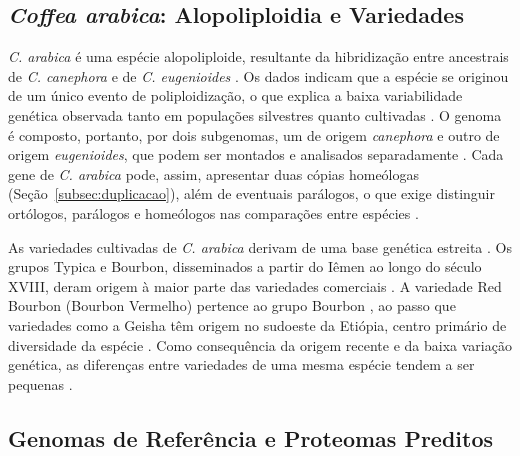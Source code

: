 \subsection{\textit{Coffea arabica}: Alopoliploidia e Variedades}

\textit{C. arabica} é uma espécie alopoliploide, resultante da hibridização entre ancestrais de \textit{C. canephora} e de \textit{C. eugenioides} \cite{Lashermes1999, Scalabrin2020}. Os dados indicam que a espécie se originou de um único evento de poliploidização, o que explica a baixa variabilidade genética observada tanto em populações silvestres quanto cultivadas \cite{Scalabrin2020}. O genoma é composto, portanto, por dois subgenomas, um de origem \textit{canephora} e outro de origem \textit{eugenioides}, que podem ser montados e analisados separadamente \cite{Scalabrin2020}. Cada gene de \textit{C. arabica} pode, assim, apresentar duas cópias homeólogas (Seção~\ref{subsec:duplicacao}), além de eventuais parálogos, o que exige distinguir ortólogos, parálogos e homeólogos nas comparações entre espécies \cite{Glover2016}.

As variedades cultivadas de \textit{C. arabica} derivam de uma base genética estreita \cite{Anthony2002}. Os grupos Typica e Bourbon, disseminados a partir do Iêmen ao longo do século XVIII, deram origem à maior parte das variedades comerciais \cite{Anthony2002}. A variedade Red Bourbon (Bourbon Vermelho) pertence ao grupo Bourbon \cite{Scalabrin2020}, ao passo que variedades como a Geisha têm origem no sudoeste da Etiópia, centro primário de diversidade da espécie \cite{Anthony2002}. Como consequência da origem recente e da baixa variação genética, as diferenças entre variedades de uma mesma espécie tendem a ser pequenas \cite{Scalabrin2020}.

\subsection{Genomas de Referência e Proteomas Preditos}
\label{subsec:genomas}

